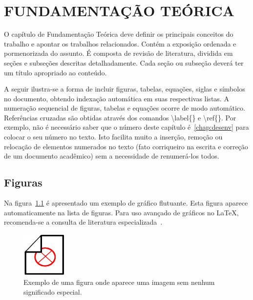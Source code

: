 \chapter{FUNDAMENTAÇÃO TEÓRICA}  

O capítulo de Fundamentação Teórica deve definir os principais conceitos do trabalho e apontar os trabalhos relacionados. Contém a exposição ordenada e pormenorizada do assunto. É composta de revisão de literatura, dividida em seções e subseções descritas detalhadamente. Cada seção ou subseção deverá ter um título apropriado ao conteúdo. 

A seguir ilustra-se a forma de incluir figuras, tabelas, equa\c{c}\~oes, siglas e s\'imbolos no documento, obtendo indexa\c{c}\~ao autom\'atica em suas respectivas listas. A numera\c{c}\~ao sequencial de figuras, tabelas e equa\c{c}\~oes ocorre de modo autom\'atico. Refer\^encias cruzadas s\~ao obtidas atrav\'es dos comandos {\ttfamily \textbackslash label\{\}} e {\ttfamily \textbackslash ref\{\}}. Por exemplo, n\~ao \'e necess\'ario saber que o n\'umero deste cap\'itulo \'e~\ref{chap:desenv} para colocar o seu n\'umero no texto. Isto facilita muito a inser\c{c}\~ao, remo\c{c}\~ao ou reloca\c{c}\~ao de elementos numerados no texto (fato corriqueiro na escrita e corre\c{c}\~ao de um documento acad\^emico) sem a necessidade de renumer\'a-los todos.

\section{Figuras}

Na figura~\ref{fig:dummy} \'e apresentado um exemplo de gr\'afico flutuante. Esta figura aparece automaticamente na lista de figuras. Para uso avan\c{c}ado de gr\'aficos no \LaTeX, recomenda-se a consulta de literatura especializada~\cite{Goossens2007}.


\begin{figure}[!htb]
	\centering
	\includegraphics[width=0.2\textwidth]{./Figuras/dummy.png} %
	\caption[Exemplo de uma figura]{Exemplo de uma figura onde aparece uma imagem sem nenhum significado especial.}
	\label{fig:dummy}
\end{figure}


